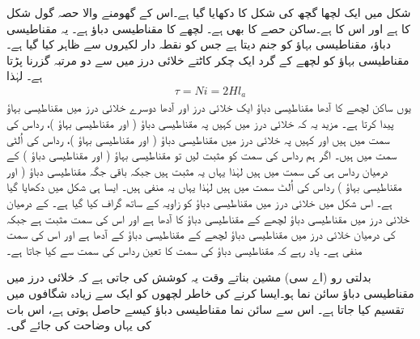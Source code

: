 شکل  میں ایک لچھا گچھ کی شکل کا دکھایا گیا ہے۔اس کے گھومنے والا حصہ گول شکل کا ہے اور اس کا  ہے۔ساکن حصے کا بھی  ہے۔ لچھے کا مقناطیسی دباؤ  ہے۔  یہ مقناطیسی دباؤ، مقناطیسی بہاؤ   کو جنم دیتا ہے جس کو نقطہ دار لکیروں سے ظاہر کیا گیا ہے۔ مقناطیسی بہاؤ کو لچھے کے گرد ایک چکر کاٹتے خلائی درز میں سے دو مرتبہ گزرنا پڑتا ہے۔ لہٰذا
\begin{align}
\tau=N i=2 H l_a
\end{align}
یوں ساکن لچھے کا آدھا مقناطیسی دباؤ ایک خلائی درز اور آدھا دوسرے خلائی درز میں مقناطیسی بہاؤ پیدا کرتا ہے۔ مزید یہ کہ خلائی درز میں کہیں پہ مقناطیسی دباؤ ( اور  مقناطیسی بہاؤ )،  رداس کی سمت میں ہیں اور کہیں  پہ خلائی درز میں مقناطیسی دباؤ ( اور مقناطیسی بہاؤ )، رداس کی اُلٹی سمت میں ہیں۔ اگر ہم رداس کی سمت کو مثبت لیں تو   مقناطیسی بہاؤ ( اور مقناطیسی دباؤ )  کے درمیان رداس ہی کی  سمت میں ہیں لہٰذا یہاں  یہ مثبت ہیں جبکہ باقی جگہ  مقناطیسی دباؤ ( اور مقناطیسی بہاؤ ) رداس کی اُلٹ سمت میں ہیں لہٰذا یہاں یہ منفی ہیں۔ ایسا ہی شکل  میں دکھایا گیا ہے۔ اس شکل میں خلائی درز میں مقناطیسی دباؤ کو زاویہ کے ساتھ گراف کیا گیا ہے۔ کے درمیان خلائی درز میں مقناطیسی دباؤ  لچھے کے مقناطیسی دباؤ  کا آدھا ہے اور اس کی سمت مثبت ہے جبکہ  کی درمیان خلائی درز میں مقناطیسی دباؤ لچھے کے مقناطیسی دباؤ کے آدھا ہے اور اس کی سمت منفی ہے۔ یاد رہے کہ مقناطیسی دباؤ کی سمت کا تعین رداس کی سمت سے کیا جاتا ہے۔

بدلتی رو (اے سی) مشین بناتے وقت یہ کوشش کی جاتی ہے کہ خلائی درز میں مقناطیسی دباؤ سائن نما ہو۔ایسا کرنے کی خاطر لچھوں کو ایک سے زیادہ شگافوں میں تقسیم کیا جاتا ہے۔ اس سے سائن نما مقناطیسی دباؤ کیسے حاصل ہوتی ہے، اس بات کی  یہاں وضاحت کی جائے گی۔

